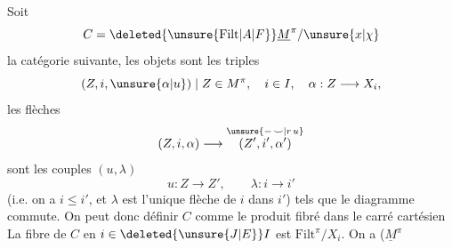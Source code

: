 Soit
\[
C=\deleted{\unsure{\mathrm{Filt}|A|F}}\underline{M}^{\pi}/\unsure{x|\chi}
\]
la catégorie suivante, les objets sont les triples
\[
(Z,i,\unsure{\alpha|u})\mid Z\in M^{\pi},\quad i\in I,\quad \alpha:Z\longrightarrow X_i,
\]
les flèches
\[
(Z,i,\alpha)\longrightarrow \overset{\unsure{{-}\,\smile|r\,u}}{(Z',i',\alpha')}
\]
sont les couples $(u,\lambda)$ 
\[
u:Z\longrightarrow Z',\qquad \lambda:i\longrightarrow i'
\]
(i.e. on a $i\leq i'$, et $\lambda$ est l'unique flèche de $i$ dans $i'$)
tels que le diagramme
commute. On peut donc définir $C$ comme le produit fibré dans le carré cartésien
 La fibre de $C$ en $i\in\deleted{\unsure{J|E}}I$ est $\mathrm{Filt}^{\pi}/X_i$. On a 
 ($\underline M^{\pi}$ 
